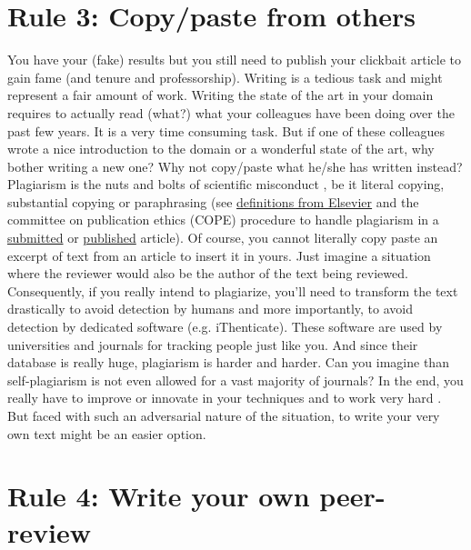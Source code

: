 \documentclass[a4paper,10pt,onecolumn]{article}
\begin{document}
\section*{Rule 3: Copy/paste from others}

You have your (fake) results but you still need to publish your clickbait
article to gain fame (and tenure and professorship). Writing is a tedious task
and might represent a fair amount of work. Writing the state of the art in your
domain requires to actually read (what?) what your colleagues have been doing
over the past few years. It is a very time consuming task. But if one of these
colleagues wrote a nice introduction to the domain or a wonderful state of the
art, why bother writing a new one? Why not copy/paste what he/she has written
instead?  Plagiarism is the nuts and bolts of scientific misconduct
\citep{neuroskeptic:2017}, be it literal copying, substantial copying or
paraphrasing (see
\href{https://www.elsevier.com/editors/perk/plagiarism-complaints}{definitions
  from Elsevier} and the committee on publication ethics (COPE) procedure to
handle plagiarism in a
\href{https://www.elsevier.com/__data/assets/pdf_file/0005/72815/plagiarism-A.pdf}{submitted}
or
\href{https://www.elsevier.com/__data/assets/pdf_file/0020/72830/plagiarism-B_0.pdf}{published}
article). Of course, you cannot literally copy paste an excerpt of text from an
article to insert it in yours. Just imagine a situation where the reviewer
would also be the author of the text being reviewed. Consequently, if you
really intend to plagiarize, you'll need to transform the text drastically to
avoid detection by humans \citep{dorigo:2015,} and more importantly, to avoid
detection by dedicated software (e.g. iThenticate). These software are used by
universities and journals for tracking people just like you. And since their
database is really huge, plagiarism is harder and harder. Can you imagine than
self-plagiarism is not even allowed for a vast majority of journals? In the
end, you really have to improve or innovate in your techniques and to work very
hard \citep{long:2009}. But faced with such an adversarial nature of the
situation, to write your very own text might be an easier option.


\section*{Rule 4: Write your own peer-review}

\end{document}
